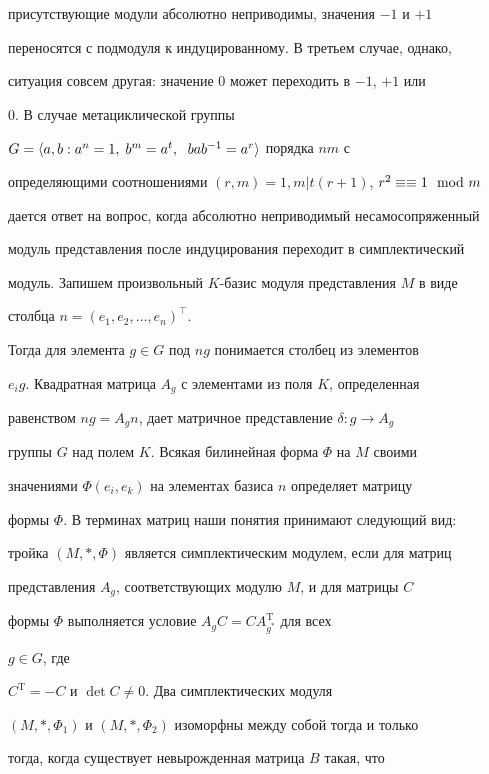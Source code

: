 присутствующие модули абсолютно неприводимы, значения $-1$ и $+1$


переносятся с подмодуля к индуцированному. В третьем случае, однако,


ситуация совсем другая: значение $0$ может переходить в $-1$, $+1$ или


$0$. В случае метациклической группы


$G=\la a,b:a^n=1, \;b^m=a^t,\ \;bab^{-1}=a^r\ra$ порядка $nm$ с




определяющими соотношениями $(r,m)=1,m|t(r+1)$, $r^2\equiv\linebreak


\equiv 1\mod{m}$


дается ответ на вопрос, когда абсолютно неприводимый несамосопряженный


модуль представления после индуцирования переходит в симплектический


модуль. Запишем произвольный $K$-базис модуля представления $M$ в виде


столбца $n=(e_1,e_2,\dotsc,e_n)^\top$.


Тогда для элемента $g\in G$ под $ng$ понимается столбец из элементов


$e_ig$. Квадратная матрица $A_g$ с элементами из поля $K$, определенная


равенством $ng=A_gn$, дает матричное представление $\delta:g\to A_g$


группы $G$ над полем $K$. Всякая билинейная форма $\Phi$ на $M$ своими


значениями $\Phi(e_i,e_k)$ на элементах базиса $n$ определяет матрицу


формы $\Phi$. В терминах матриц наши понятия принимают следующий вид:


тройка $(M,*,\Phi)$ является симплектическим модулем, если для матриц


представления $A_g$, соответствующих модулю $M$, и для матрицы $C$


формы $\Phi$ выполняется условие $A_gC=CA^{\mathrm T}_{g^*}$ для всех


$g\in G$, где


$C^{\mathrm T}=-C$ и $\det C\ne 0$. Два симплектических модуля


$(M,*,\Phi_1)$ и $(M,*,\Phi_2)$ изоморфны между собой тогда и только


тогда, когда существует невырожденная матрица $B$ такая, что



